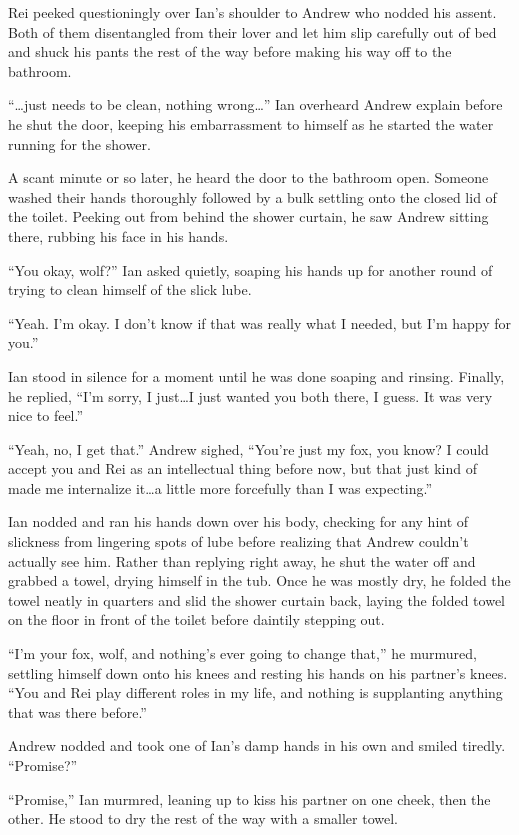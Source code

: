 Rei peeked questioningly over Ian's shoulder to Andrew who nodded his assent. Both of them disentangled from their lover and let him slip carefully out of bed and shuck his pants the rest of the way before making his way off to the bathroom.

``\ldots{}just needs to be clean, nothing wrong\ldots{}'' Ian overheard Andrew explain before he shut the door, keeping his embarrassment to himself as he started the water running for the shower.

A scant minute or so later, he heard the door to the bathroom open. Someone washed their hands thoroughly followed by a bulk settling onto the closed lid of the toilet. Peeking out from behind the shower curtain, he saw Andrew sitting there, rubbing his face in his hands.

``You okay, wolf?'' Ian asked quietly, soaping his hands up for another round of trying to clean himself of the slick lube.

``Yeah. I'm okay. I don't know if that was really what I needed, but I'm happy for you.''

Ian stood in silence for a moment until he was done soaping and rinsing. Finally, he replied, ``I'm sorry, I just\ldots{}I just wanted you both there, I guess. It was very nice to feel.''

``Yeah, no, I get that.'' Andrew sighed, ``You're just my fox, you know? I could accept you and Rei as an intellectual thing before now, but that just kind of made me internalize it\ldots{}a little more forcefully than I was expecting.''

Ian nodded and ran his hands down over his body, checking for any hint of slickness from lingering spots of lube before realizing that Andrew couldn't actually see him. Rather than replying right away, he shut the water off and grabbed a towel, drying himself in the tub. Once he was mostly dry, he folded the towel neatly in quarters and slid the shower curtain back, laying the folded towel on the floor in front of the toilet before daintily stepping out.

``I'm your fox, wolf, and nothing's ever going to change that,'' he murmured, settling himself down onto his knees and resting his hands on his partner's knees. ``You and Rei play different roles in my life, and nothing is supplanting anything that was there before.''

Andrew nodded and took one of Ian's damp hands in his own and smiled tiredly. ``Promise?''

``Promise,'' Ian murmred, leaning up to kiss his partner on one cheek, then the other. He stood to dry the rest of the way with a smaller towel.


